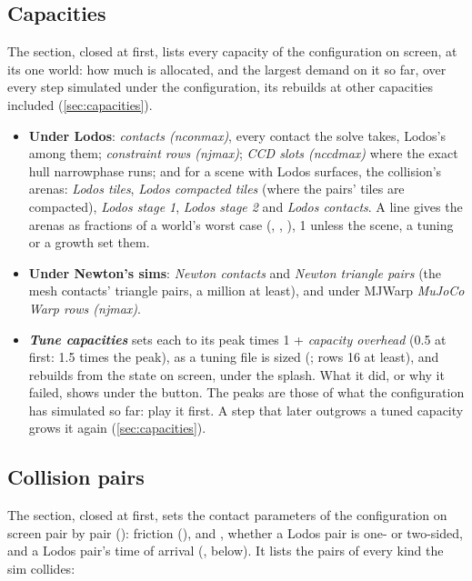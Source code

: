 \subsection{Capacities}\label{sec:capspanel}

The section, closed at first, lists every capacity of the configuration on screen, at its one world: how much is allocated, and the largest demand on it so far, over every step simulated under the configuration, its rebuilds at other capacities included (\cref{sec:capacities}).

\begin{itemize}
\item \textbf{Under Lodos}: \emph{contacts (nconmax)}, every contact the solve takes, Lodos's among them; \emph{constraint rows (njmax)}; \emph{CCD slots (nccdmax)} where the exact hull narrowphase runs; and for a scene with Lodos surfaces, the collision's arenas: \emph{Lodos tiles}, \emph{Lodos compacted tiles} (where the pairs' tiles are compacted), \emph{Lodos stage 1}, \emph{Lodos stage 2} and \emph{Lodos contacts}. A line gives the arenas as fractions of a world's worst case (, , ), 1 unless the scene, a tuning or a growth set them.
\item \textbf{Under Newton's sims}: \emph{Newton contacts} and \emph{Newton triangle pairs} (the mesh contacts' triangle pairs, a million at least), and under MJWarp \emph{MuJoCo Warp rows (njmax)}.
\item \textbf{\emph{Tune capacities}} sets each to its peak times 1 + \emph{capacity overhead} (0.5 at first: 1.5 times the peak), as a tuning file is sized (; rows 16 at least), and rebuilds from the state on screen, under the splash. What it did, or why it failed, shows under the button. The peaks are those of what the configuration has simulated so far: play it first. A step that later outgrows a tuned capacity grows it again (\cref{sec:capacities}).
\end{itemize}

\subsection{Collision pairs}\label{sec:pairs}

The section, closed at first, sets the contact parameters of the configuration on screen pair by pair (): friction (),  and , whether a Lodos pair is one- or two-sided, and a Lodos pair's time of arrival (, below). It lists the pairs of every kind the sim collides:

